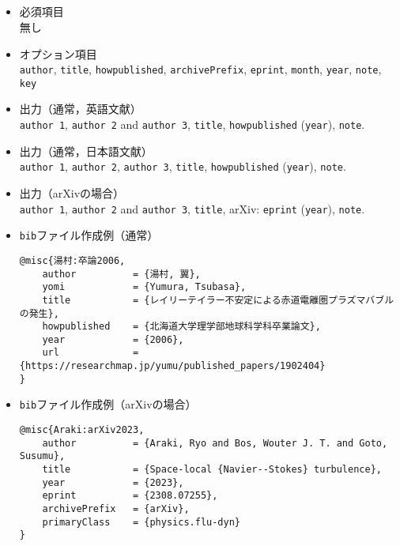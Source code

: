 \documentclass[a4paper,fleqn,uplatex,dvipdfmx]{jsarticle}
\begin{document}
\subsection{\ttmisc}
\label{ssec:misc}
\begin{screen}
    \begin{itemize}
        \item 必須項目 \\
        無し
        \item オプション項目 \\
        \verb|author|, \verb|title|, \verb|howpublished|, \verb|archivePrefix|, \verb|eprint|, \verb|month|, \verb|year|, \verb|note|, \verb|key|
        \item 出力（通常，英語文献） \\
            \colorbox[gray]{0.8}{\texttt{author 1}}, \colorbox[gray]{0.8}{\texttt{author 2}} and \colorbox[gray]{0.8}{\texttt{author 3}}, \colorbox[gray]{0.8}{\texttt{title}}, \colorbox[gray]{0.8}{\texttt{howpublished}} (\colorbox[gray]{0.8}{\texttt{year}}), \colorbox[gray]{0.8}{\texttt{note}}.
        \item 出力（通常，日本語文献） \\
            \colorbox[gray]{0.8}{\texttt{author 1}}, \colorbox[gray]{0.8}{\texttt{author 2}}, \colorbox[gray]{0.8}{\texttt{author 3}}, \colorbox[gray]{0.8}{\texttt{title}}, \colorbox[gray]{0.8}{\texttt{howpublished}} (\colorbox[gray]{0.8}{\texttt{year}}), \colorbox[gray]{0.8}{\texttt{note}}.
        \item 出力（arXivの場合） \\
            \colorbox[gray]{0.8}{\texttt{author 1}}, \colorbox[gray]{0.8}{\texttt{author 2}} and \colorbox[gray]{0.8}{\texttt{author 3}}, \colorbox[gray]{0.8}{\texttt{title}}, arXiv: \colorbox[gray]{0.8}{\texttt{eprint}} (\colorbox[gray]{0.8}{\texttt{year}}), \colorbox[gray]{0.8}{\texttt{note}}.
        \item \verb|bib|ファイル作成例（通常） \vspace{-3mm}
\begin{verbatim}
@misc{湯村:卒論2006,
    author          = {湯村, 翼},
    yomi            = {Yumura, Tsubasa},
    title           = {レイリーテイラー不安定による赤道電離圏プラズマバブルの発生},
    howpublished    = {北海道大学理学部地球科学科卒業論文},
    year            = {2006},
    url             = {https://researchmap.jp/yumu/published_papers/1902404}
}
\end{verbatim}
        \item \verb|bib|ファイル作成例（arXivの場合） \vspace{-3mm}
\begin{verbatim}
@misc{Araki:arXiv2023,
    author          = {Araki, Ryo and Bos, Wouter J. T. and Goto, Susumu},
    title           = {Space-local {Navier--Stokes} turbulence}, 
    year            = {2023},
    eprint          = {2308.07255},
    archivePrefix   = {arXiv},
    primaryClass    = {physics.flu-dyn}
}
\end{verbatim}
    \end{itemize}
\end{screen}
\end{document}

